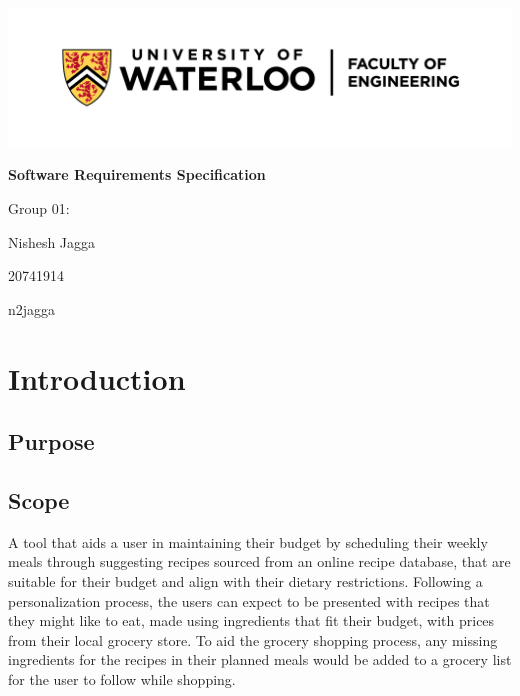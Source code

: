 \documentclass[11pt, letterpaper]{report}
\author{Nishesh Jagga}
\begin{document}
\begin{titlepage}
    \centering
    \includegraphics[width=\textwidth]{images/logo.png}\par
    \vspace{1cm}
    {\bfseries Software Requirements Specification\par}
    \vspace{5cm}
    {Group 01: \par}
    {Nishesh Jagga \par}
    {20741914 \par}
    {n2jagga \par}
\end{titlepage}
\restoregeometry

\tableofcontents
\clearpage

\listoffigures
\clearpage

\chapter{Introduction}
\setcounter{page}{1}

\section{Purpose}

\section{Scope}
A tool that aids a user in maintaining their budget by scheduling their weekly meals through suggesting recipes sourced from an online recipe database, that are suitable for their budget and align with their dietary restrictions. Following a personalization process, the users can expect to be presented with recipes that they might like to eat, made using ingredients that fit their budget, with prices from their local grocery store. To aid the grocery shopping process, any missing ingredients for the recipes in their planned meals would be added to a grocery list for the user to follow while shopping.
\end{document}
